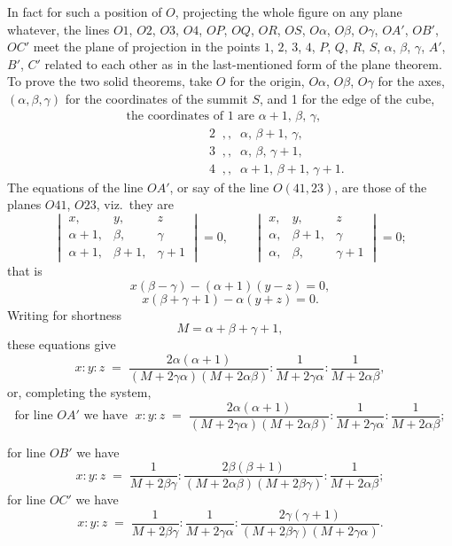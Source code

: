 \documentclass[11pt]{article}
\begin{document}
In fact for such a position of $O$, projecting the whole figure on any plane whatever, the lines $O1$, $O2$, $O3$, $O4$, $OP$, $OQ$, $OR$, $OS$, $O\alpha$, $O\beta$, $O\gamma$, $OA'$, $OB'$, $OC'$ meet the plane of projection in the points $1$, $2$, $3$, $4$, $P$, $Q$, $R$, $S$, $\alpha$, $\beta$, $\gamma$, $A'$, $B'$, $C'$ related to each other as in the last-mentioned form of the plane theorem. To prove the two solid theorems, take $O$ for the origin, $O\alpha$, $O\beta$, $O\gamma$ for the axes, $(\alpha, \beta, \gamma)$ for the coordinates of the summit $S$, and 1 for the edge of the cube,
\begin{align*}
& \text{the coordinates of } 1 \text{ are } \alpha+1,\, \beta,\, \gamma,\\
& \;\;\;\;\;\;\;\;\;\;\;\;\;\;\;\;\;\;\;\;\;\;\;\; 2 \;\;,, \;\; \alpha,\, \beta+1,\, \gamma,\\
& \;\;\;\;\;\;\;\;\;\;\;\;\;\;\;\;\;\;\;\;\;\;\;\; 3 \;\;,, \;\; \alpha,\, \beta,\, \gamma+1,\\
& \;\;\;\;\;\;\;\;\;\;\;\;\;\;\;\;\;\;\;\;\;\;\;\; 4 \;\;,, \;\; \alpha+1,\, \beta+1,\, \gamma+1.
\end{align*}
The equations of the line $OA'$, or say of the line $O(41, 23)$, are those of the planes $O41$, $O23$, viz.\ they are
\[
\begin{vmatrix} x, & y, & z \\ \alpha+1, & \beta, & \gamma \\ \alpha+1, & \beta+1, & \gamma+1 \end{vmatrix} = 0,\qquad
\begin{vmatrix} x, & y, & z \\ \alpha, & \beta+1, & \gamma \\ \alpha, & \beta, & \gamma+1 \end{vmatrix} = 0;
\]
that is
\[
x(\beta - \gamma) - (\alpha + 1)(y - z) = 0,
\]
\[
x(\beta + \gamma + 1) - \alpha(y + z) = 0.
\]
Writing for shortness
\[
M = \alpha + \beta + \gamma + 1,
\]
these equations give
\[
x : y : z \;=\; \frac{2\alpha(\alpha + 1)}{(M + 2\gamma\alpha)(M + 2\alpha\beta)} : \frac{1}{M + 2\gamma\alpha} : \frac{1}{M + 2\alpha\beta},
\]
or, completing the system,
\[
\text{for line } OA' \text{ we have } \; x : y : z \;=\; \frac{2\alpha(\alpha + 1)}{(M + 2\gamma\alpha)(M + 2\alpha\beta)} : \frac{1}{M + 2\gamma\alpha} : \frac{1}{M + 2\alpha\beta};
\]

\newpage

\noindent for line $OB'$ we have
\[
x : y : z \;=\; \frac{1}{M + 2\beta\gamma} : \frac{2\beta(\beta + 1)}{(M + 2\alpha\beta)(M + 2\beta\gamma)} : \frac{1}{M + 2\alpha\beta};
\]
for line $OC'$ we have
\[
x : y : z \;=\; \frac{1}{M + 2\beta\gamma} : \frac{1}{M + 2\gamma\alpha} : \frac{2\gamma(\gamma + 1)}{(M + 2\beta\gamma)(M + 2\gamma\alpha)}.
\]
\end{document}
